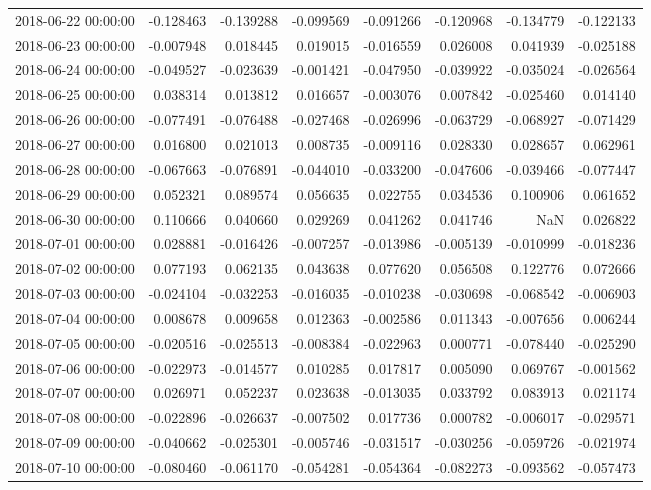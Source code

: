 \begin{tabular}{lrrrrrrr}
2018-06-22 00:00:00 & -0.128463 & -0.139288 & -0.099569 & -0.091266 & -0.120968 & -0.134779 & -0.122133 \\
2018-06-23 00:00:00 & -0.007948 & 0.018445 & 0.019015 & -0.016559 & 0.026008 & 0.041939 & -0.025188 \\
2018-06-24 00:00:00 & -0.049527 & -0.023639 & -0.001421 & -0.047950 & -0.039922 & -0.035024 & -0.026564 \\
2018-06-25 00:00:00 & 0.038314 & 0.013812 & 0.016657 & -0.003076 & 0.007842 & -0.025460 & 0.014140 \\
2018-06-26 00:00:00 & -0.077491 & -0.076488 & -0.027468 & -0.026996 & -0.063729 & -0.068927 & -0.071429 \\
2018-06-27 00:00:00 & 0.016800 & 0.021013 & 0.008735 & -0.009116 & 0.028330 & 0.028657 & 0.062961 \\
2018-06-28 00:00:00 & -0.067663 & -0.076891 & -0.044010 & -0.033200 & -0.047606 & -0.039466 & -0.077447 \\
2018-06-29 00:00:00 & 0.052321 & 0.089574 & 0.056635 & 0.022755 & 0.034536 & 0.100906 & 0.061652 \\
2018-06-30 00:00:00 & 0.110666 & 0.040660 & 0.029269 & 0.041262 & 0.041746 & NaN & 0.026822 \\
2018-07-01 00:00:00 & 0.028881 & -0.016426 & -0.007257 & -0.013986 & -0.005139 & -0.010999 & -0.018236 \\
2018-07-02 00:00:00 & 0.077193 & 0.062135 & 0.043638 & 0.077620 & 0.056508 & 0.122776 & 0.072666 \\
2018-07-03 00:00:00 & -0.024104 & -0.032253 & -0.016035 & -0.010238 & -0.030698 & -0.068542 & -0.006903 \\
2018-07-04 00:00:00 & 0.008678 & 0.009658 & 0.012363 & -0.002586 & 0.011343 & -0.007656 & 0.006244 \\
2018-07-05 00:00:00 & -0.020516 & -0.025513 & -0.008384 & -0.022963 & 0.000771 & -0.078440 & -0.025290 \\
2018-07-06 00:00:00 & -0.022973 & -0.014577 & 0.010285 & 0.017817 & 0.005090 & 0.069767 & -0.001562 \\
2018-07-07 00:00:00 & 0.026971 & 0.052237 & 0.023638 & -0.013035 & 0.033792 & 0.083913 & 0.021174 \\
2018-07-08 00:00:00 & -0.022896 & -0.026637 & -0.007502 & 0.017736 & 0.000782 & -0.006017 & -0.029571 \\
2018-07-09 00:00:00 & -0.040662 & -0.025301 & -0.005746 & -0.031517 & -0.030256 & -0.059726 & -0.021974 \\
2018-07-10 00:00:00 & -0.080460 & -0.061170 & -0.054281 & -0.054364 & -0.082273 & -0.093562 & -0.057473 \\

\end{tabular}

